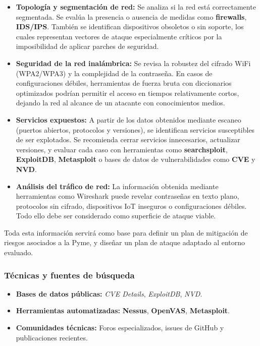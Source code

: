 \documentclass[a4paper, 11pt]{article}
\begin{document}
\begin{itemize}
    \item \textbf{Topología y segmentación de red:} Se analiza si la red está correctamente segmentada. Se evalúa la presencia o ausencia de medidas como \textbf{firewalls}, \textbf{IDS/IPS}. También se identifican dispositivos obsoletos o sin soporte, los cuales representan vectores de ataque especialmente críticos por la imposibilidad de aplicar parches de seguridad.

    \item \textbf{Seguridad de la red inalámbrica:} Se revisa la robustez del cifrado WiFi (WPA2/WPA3) y la complejidad de la contraseña. En casos de configuraciones débiles, herramientas de fuerza bruta con diccionarios optimizados podrían permitir el acceso en tiempos relativamente cortos, dejando la red al alcance de un atacante con conocimientos medios.

    \item \textbf{Servicios expuestos:} A partir de los datos obtenidos mediante escaneo (puertos abiertos, protocolos y versiones), se identifican servicios susceptibles de ser explotados. Se recomienda cerrar servicios innecesarios, actualizar versiones, y evaluar cada caso con herramientas como \textbf{searchsploit}, \textbf{ExploitDB}, \textbf{Metasploit} o bases de datos de vulnerabilidades como \textbf{CVE} y \textbf{NVD}.
    
    \item \textbf{Análisis del tráfico de red:} La información obtenida mediante herramientas como Wireshark puede revelar contraseñas en texto plano, protocolos sin cifrado, dispositivos IoT inseguros o configuraciones débiles. Todo ello debe ser considerado como superficie de ataque viable.
\end{itemize}

\vspace{0.3cm}
Toda esta información servirá como base para definir un plan de mitigación de riesgos asociados a la Pyme, y diseñar un plan de ataque adaptado al entorno evaluado.

\vspace{0.5cm}
\subsubsection*{Técnicas y fuentes de búsqueda}

\begin{itemize}
    \item \textbf{Bases de datos públicas:} \textit{CVE Details}, \textit{ExploitDB}, \textit{NVD}.
    \item \textbf{Herramientas automatizadas:} \textbf{Nessus}, \textbf{OpenVAS}, \textbf{Metasploit}.
    \item \textbf{Comunidades técnicas:} Foros especializados, issues de GitHub y publicaciones recientes.
\end{itemize}
\end{document}
